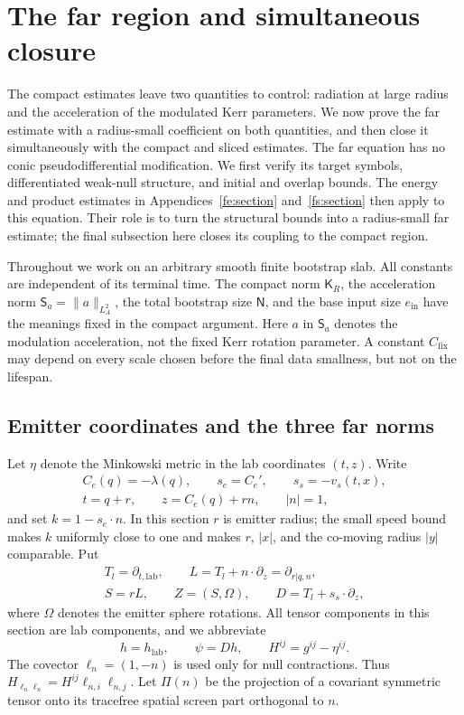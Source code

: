 \section{The far region and simultaneous closure}\label{sec:far}

The compact estimates leave two quantities to control: radiation at large
radius and the acceleration of the modulated Kerr parameters.  We now prove
the far estimate with a radius-small coefficient on both quantities, and
then close it simultaneously with the compact and sliced estimates.
The far equation has no conic pseudodifferential modification.  We first
verify its target symbols, differentiated weak-null structure, and
initial and overlap bounds.  The energy and product estimates in
Appendices~\ref{fe:section} and~\ref{fs:section} then apply to this
equation.  Their role is to turn the structural bounds into a
radius-small far estimate; the final subsection here closes its
coupling to the compact region.

Throughout we work on an arbitrary smooth finite bootstrap slab.  All
constants are independent of its terminal time.  The compact norm
$\mathsf K_R$, the acceleration norm
$\mathsf S_a=\|a\|_{L^2_A}$, the total bootstrap size $\mathsf N$, and the
base input size $e_{\mathrm{in}}$ have the meanings fixed in the compact
argument.  Here $a$ in $\mathsf S_a$ denotes the modulation acceleration,
not the fixed Kerr rotation parameter.  A constant $C_{\mathrm{fix}}$ may
depend on every scale chosen before the final data smallness, but not on
the lifespan.

\subsection{Emitter coordinates and the three far norms}

Let $\eta$ denote the Minkowski metric in the lab coordinates $(t,z)$.
Write
\[
 \begin{gathered}
 C_e(q)=-\lambda(q),\qquad s_e=C_e',\qquad s_s=-v_s(t,x),\\
 t=q+r,\qquad z=C_e(q)+rn,\qquad |n|=1,
 \end{gathered}
\]
and set $k=1-s_e\cdot n$.  In this section $r$ is emitter radius; the
small speed bound makes $k$ uniformly close to one and makes $r$, $|x|$,
and the co-moving radius $|y|$ comparable.  Put
\[
 \begin{gathered}
 T_l=\partial_{t,\mathrm{lab}},\qquad
 L=T_l+n\cdot\partial_z=\partial_{r|q,n},\\
 S=rL,\qquad Z=(S,\Omega),\qquad D=T_l+s_s\cdot\partial_z,
 \end{gathered}
\]
where $\Omega$ denotes the emitter sphere rotations.  All tensor
components in this section are lab components, and we abbreviate
\[
 h=h_{\mathrm{lab}},\qquad \psi=Dh,\qquad H^{ij}=g^{ij}-\eta^{ij}.
\]
The covector $\ell_n=(1,-n)$ is used only for null contractions.  Thus
$H_{\ell_n\ell_n}=H^{ij}\ell_{n,i}\ell_{n,j}$.  Let $\Pi(n)$ be the
projection of a covariant symmetric tensor onto its tracefree spatial
screen part orthogonal to $n$.

